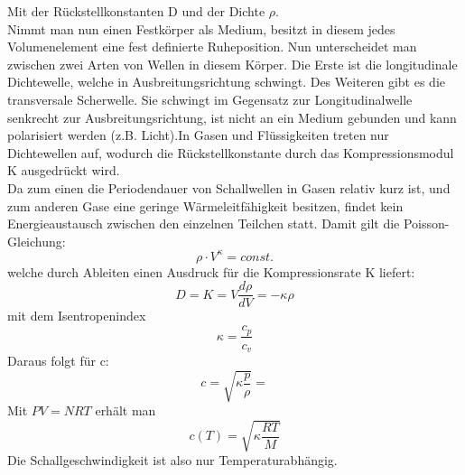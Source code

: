 \documentclass{article}
\begin{document}
{Mit der Rückstellkonstanten D und der Dichte \(\rho\).\\
Nimmt man nun einen Festkörper als Medium, besitzt in diesem jedes Volumenelement eine fest definierte Ruheposition. Nun unterscheidet man zwischen zwei Arten von Wellen in diesem Körper. Die Erste ist die longitudinale Dichtewelle, welche in Ausbreitungsrichtung schwingt. Des Weiteren gibt es die transversale Scherwelle. Sie schwingt im Gegensatz zur Longitudinalwelle senkrecht zur Ausbreitungsrichtung, ist nicht an ein Medium gebunden und kann polarisiert werden (z.B. Licht).In Gasen und Flüssigkeiten treten nur Dichtewellen auf, wodurch die Rückstellkonstante durch das Kompressionsmodul K ausgedrückt wird.\\
Da zum einen die Periodendauer von Schallwellen in Gasen relativ kurz ist, und zum anderen Gase eine geringe Wärmeleitfähigkeit besitzen, findet kein Energieaustausch zwischen den einzelnen Teilchen statt. Damit gilt die Poisson-Gleichung:
\begin{equation}
\label{rho}
\rho \cdot V^{\kappa} = const.
\end{equation}
welche durch Ableiten einen Ausdruck für die Kompressionsrate K liefert:
\begin{equation}
\label{K}
D = K = V \frac{d\rho}{dV}=-\kappa \rho
\end{equation}
mit dem Isentropenindex 
\begin{equation}
\label{kappa}
\kappa = \frac{c_{p}}{c_{v}}
\end{equation}
Daraus folgt für c:
\begin{equation}
c=\sqrt{\kappa\frac{p}{\rho}}=
\end{equation}
Mit \(PV = NRT\) erhält man
\begin{equation}
c(T) = \sqrt{\kappa\frac{RT}{M}} \label{c(t)}
\end{equation}
Die Schallgeschwindigkeit ist also nur Temperaturabhängig.

\newpage
}
\end{document}
